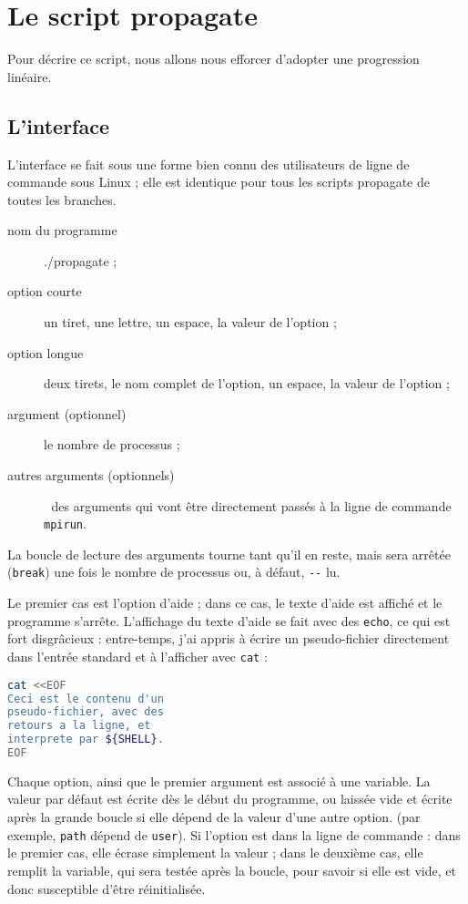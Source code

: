 \chapter{Le script propagate}
\label{app:propagate}


Pour décrire ce script, nous allons nous efforcer d'adopter une
progression linéaire.



\section{L'interface}

L'interface se fait sous une forme bien connu des utilisateurs de
ligne de commande sous Linux ; elle est identique pour tous les
scripts propagate de toutes les branches.

\begin{description}
\item[nom du programme] ./propagate ;
\item[option courte] un tiret, une lettre, un espace, la valeur de
  l'option ;
\item[option longue] deux tirets, le nom complet de l'option, un
  espace, la valeur de l'option ;
\item[argument  (optionnel)] le nombre de processus ;
\item[autres arguments (optionnels)]\null$\;$ des arguments qui
  vont être directement passés à la ligne de commande \texttt{mpirun}.
\end{description}

La boucle de lecture des arguments tour\-ne tant qu'il en reste, mais
sera arrêtée (\texttt{break}) une fois le nombre de processus ou, à
défaut, \texttt{-\null-} lu.

Le premier cas est l'option d'aide ; dans ce cas, le texte d'aide est
affiché et le programme s'arrête. L'affichage du texte d'aide se fait
avec des \texttt{echo}, ce qui est fort disgrâcieux : entre-temps,
j'ai appris à écrire un pseudo-fichier directement dans l'entrée
standard et à l'afficher avec \texttt{cat} :

\begin{lstlisting}[language=bash]
  cat <<EOF
Ceci est le contenu d'un
pseudo-fichier, avec des
retours a la ligne, et
interprete par ${SHELL}.
EOF
\end{lstlisting} %

Chaque option, ainsi que le premier argument est associé à une
variable. La valeur par défaut est écrite dès le début du programme,
ou laissée vide et écrite après la grande boucle si elle dépend de la
valeur d'une autre option. (par exemple, \texttt{path} dépend de
\texttt{user}). Si l'option est dans la ligne de commande : dans le
premier cas, elle écrase simplement la valeur ; dans le deuxième cas,
elle remplit la variable, qui sera testée après la boucle, pour savoir
si elle est vide, et donc susceptible d'être réinitialisée.


